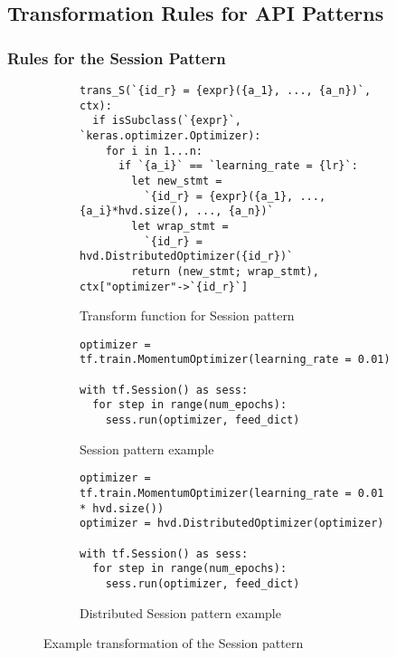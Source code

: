 \subsection{Transformation Rules for API Patterns}


\subsubsection{Rules for the Session Pattern}

\begin{figure}[h!]\centering

  \begin{subfigure}{1\textwidth}
  \scriptsize
  \begin{lstlisting}[style=mpythonscript]
trans_S(`{id_r} = {expr}({a_1}, ..., {a_n})`, ctx): 
  if isSubclass(`{expr}`, `keras.optimizer.Optimizer):
    for i in 1...n:
      if `{a_i}` == `learning_rate = {lr}`:
        let new_stmt = 
          `{id_r} = {expr}({a_1}, ..., {a_i}*hvd.size(), ..., {a_n})`
        let wrap_stmt = 
          `{id_r} = hvd.DistributedOptimizer({id_r})`
        return (new_stmt; wrap_stmt), ctx["optimizer"->`{id_r}`] \end{lstlisting}
  \caption{Transform function for Session pattern}
  \label{fig:trans:sessiontrans:fn}
  \end{subfigure}

  \begin{subfigure}[t]{1\textwidth}
    \begin{lstlisting}[style=mpython]
optimizer = tf.train.MomentumOptimizer(learning_rate = 0.01)

with tf.Session() as sess:
  for step in range(num_epochs): 
    sess.run(optimizer, feed_dict)\end{lstlisting}
    \caption{Session pattern example}
    \label{fig:trans:sessiontrans:a}
  \end{subfigure}
  \hspace{5mm}
  \begin{subfigure}[t]{1\textwidth}
    \begin{lstlisting}[style=mpython]
optimizer = tf.train.MomentumOptimizer(learning_rate = 0.01 * hvd.size())
optimizer = hvd.DistributedOptimizer(optimizer)

with tf.Session() as sess:
  for step in range(num_epochs): 
    sess.run(optimizer, feed_dict)\end{lstlisting}
    \caption{Distributed Session pattern example}
    \label{fig:trans:sessiontrans:b}
  \end{subfigure}
  \caption{Example transformation of the Session pattern}
  \label{fig:trans:sessiontrans}
\end{figure}

